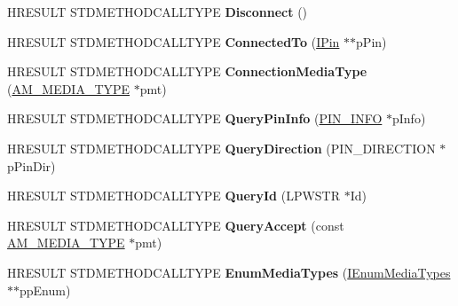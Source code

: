 \begin{DoxyCompactItemize}
\item 
\mbox{\label{class_c_output_pin_ac579e2a37c398737c1dee9bebb1ad58a}} 
H\+R\+E\+S\+U\+LT S\+T\+D\+M\+E\+T\+H\+O\+D\+C\+A\+L\+L\+T\+Y\+PE {\bfseries Disconnect} ()
\item 
\mbox{\label{class_c_output_pin_a2c5a4e196c887539b7ffff58bdd08d2e}} 
H\+R\+E\+S\+U\+LT S\+T\+D\+M\+E\+T\+H\+O\+D\+C\+A\+L\+L\+T\+Y\+PE {\bfseries Connected\+To} (\hyperlink{interface_i_pin}{I\+Pin} $\ast$$\ast$p\+Pin)
\item 
\mbox{\label{class_c_output_pin_a96e899a9744393322079f3d0233c0593}} 
H\+R\+E\+S\+U\+LT S\+T\+D\+M\+E\+T\+H\+O\+D\+C\+A\+L\+L\+T\+Y\+PE {\bfseries Connection\+Media\+Type} (\hyperlink{struct_a_m___m_e_d_i_a___t_y_p_e}{A\+M\+\_\+\+M\+E\+D\+I\+A\+\_\+\+T\+Y\+PE} $\ast$pmt)
\item 
\mbox{\label{class_c_output_pin_a10eecb539997c513f4cc99259eb79fdb}} 
H\+R\+E\+S\+U\+LT S\+T\+D\+M\+E\+T\+H\+O\+D\+C\+A\+L\+L\+T\+Y\+PE {\bfseries Query\+Pin\+Info} (\hyperlink{struct_i_pin_1_1___pin_info}{P\+I\+N\+\_\+\+I\+N\+FO} $\ast$p\+Info)
\item 
\mbox{\label{class_c_output_pin_a79861a178eeaaf4c1e727eeebbae1f1c}} 
H\+R\+E\+S\+U\+LT S\+T\+D\+M\+E\+T\+H\+O\+D\+C\+A\+L\+L\+T\+Y\+PE {\bfseries Query\+Direction} (P\+I\+N\+\_\+\+D\+I\+R\+E\+C\+T\+I\+ON $\ast$p\+Pin\+Dir)
\item 
\mbox{\label{class_c_output_pin_a8ad136561b14834a2b762b91a4b5f6ab}} 
H\+R\+E\+S\+U\+LT S\+T\+D\+M\+E\+T\+H\+O\+D\+C\+A\+L\+L\+T\+Y\+PE {\bfseries Query\+Id} (L\+P\+W\+S\+TR $\ast$Id)
\item 
\mbox{\label{class_c_output_pin_a71d68abfd20474f6ccd5042f27ef4da8}} 
H\+R\+E\+S\+U\+LT S\+T\+D\+M\+E\+T\+H\+O\+D\+C\+A\+L\+L\+T\+Y\+PE {\bfseries Query\+Accept} (const \hyperlink{struct_a_m___m_e_d_i_a___t_y_p_e}{A\+M\+\_\+\+M\+E\+D\+I\+A\+\_\+\+T\+Y\+PE} $\ast$pmt)
\item 
\mbox{\label{class_c_output_pin_aa097c691393ffc75a7e9a552b687b712}} 
H\+R\+E\+S\+U\+LT S\+T\+D\+M\+E\+T\+H\+O\+D\+C\+A\+L\+L\+T\+Y\+PE {\bfseries Enum\+Media\+Types} (\hyperlink{interface_i_enum_media_types}{I\+Enum\+Media\+Types} $\ast$$\ast$pp\+Enum)

\end{DoxyCompactItemize}
